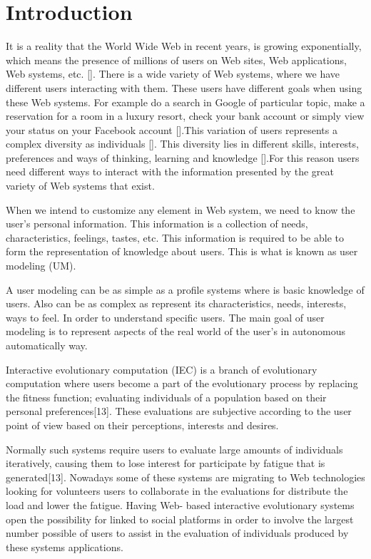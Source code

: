 \chapter{Introduction} \label{introduction} 


\par It is a reality that the World Wide Web in recent years, is growing
exponentially, which means the presence of millions of users on Web sites, Web
applications, Web systems, etc. []. There is a wide variety of Web systems,
where we have different users interacting with them. These users have different
goals when using these Web systems. For example do a search in Google \cite{google} of
particular topic, make a reservation for a room in a luxury resort, check your
bank account or simply view your status on your Facebook account [].This
variation of users represents a complex diversity as individuals []. This
diversity lies in different skills, interests, preferences and ways of thinking,
learning and knowledge [].For this reason users need different ways to interact
with the information presented by the great variety of Web systems that exist.
\par When we intend to customize any element in Web system, we need to
know the user's personal information. This information is a collection of needs,
characteristics, feelings, tastes, etc. This information is required to be able
to form the representation of knowledge about users. This is what is known as
user modeling (UM).  
\par A user modeling can be as simple as a profile
systems where is basic knowledge of users. Also  can be as complex as represent
its characteristics, needs, interests, ways to feel. In order to understand
specific users. The main goal of user modeling is to represent aspects of the
real world of the user's in  autonomous automatically way.  

\par Interactive evolutionary computation (IEC)
is a branch of evolutionary computation where users become a part of the
evolutionary process by replacing the fitness function; evaluating individuals
of a population based on their personal preferences[13]. These evaluations are
subjective according to the user point of view based on their perceptions,
interests and desires.  
\par Normally such systems require users to evaluate large amounts of individuals 
iteratively, causing them to lose interest for participate by fatigue that 
is generated[13]. Nowadays some of these systems
are migrating to  Web technologies looking for volunteers users to collaborate
in the evaluations for distribute the load and lower the fatigue. Having Web-
based interactive evolutionary systems open the possibility for linked to social
platforms in order to involve the largest number possible of users to assist in
the evaluation of individuals produced by these systems applications.

